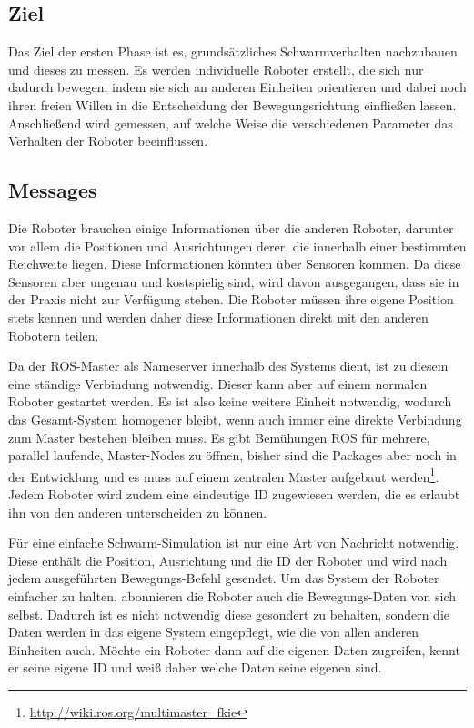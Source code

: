 \subsection*{Ziel}

Das Ziel der ersten Phase ist es, grundsätzliches Schwarmverhalten nachzubauen und dieses zu messen. Es werden individuelle Roboter erstellt, die sich nur dadurch bewegen, indem sie sich an anderen Einheiten orientieren und dabei noch ihren freien Willen in die Entscheidung der Bewegungsrichtung einfließen lassen. Anschließend wird gemessen, auf welche Weise die verschiedenen Parameter das Verhalten der Roboter beeinflussen.

\subsection*{Messages}\label{subsec:NachbauNachrichten}

Die Roboter brauchen einige Informationen über die anderen Roboter, darunter vor allem die Positionen und Ausrichtungen derer, die innerhalb einer bestimmten Reichweite liegen. Diese Informationen könnten über Sensoren kommen. Da diese Sensoren aber ungenau und kostspielig sind, wird davon ausgegangen, dass sie in der Praxis nicht zur Verfügung stehen. Die Roboter müssen ihre eigene Position stets kennen und werden daher diese Informationen direkt mit den anderen Robotern teilen.

Da der \ac{ROS}-Master als Nameserver innerhalb des Systems dient, ist zu diesem eine ständige Verbindung notwendig. Dieser kann aber auf einem normalen Roboter gestartet werden. Es ist also keine weitere Einheit notwendig, wodurch das Gesamt-System homogener bleibt, wenn auch immer eine direkte Verbindung zum Master bestehen bleiben muss. Es gibt Bemühungen \ac{ROS} für mehrere, parallel laufende, Master-Nodes zu öffnen, bisher sind die Packages aber noch in der Entwicklung und es muss auf einem zentralen Master aufgebaut werden\footnote{\url{http://wiki.ros.org/multimaster_fkie}}.
Jedem Roboter wird zudem eine eindeutige ID zugewiesen werden, die es erlaubt ihn von den anderen unterscheiden zu können.

Für eine einfache Schwarm-Simulation ist nur eine Art von Nachricht notwendig. Diese enthält die Position, Ausrichtung und die ID der Roboter und wird nach jedem ausgeführten Bewegungs-Befehl gesendet. Um das System der Roboter einfacher zu halten, abonnieren die Roboter auch die Bewegungs-Daten von sich selbst. Dadurch ist es nicht notwendig diese gesondert zu behalten, sondern die Daten werden in das eigene System eingepflegt, wie die von allen anderen Einheiten auch. Möchte ein Roboter dann auf die eigenen Daten zugreifen, kennt er seine eigene ID und weiß daher welche Daten seine eigenen sind.

